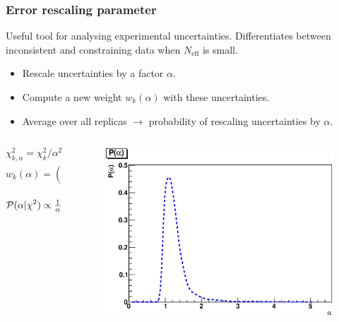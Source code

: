 \documentclass[10pt]{beamer}
\newcommand{\be}{\begin{equation*}}
\newcommand{\ee}{\end{equation*}}
\def\smallfrac#1#2{\hbox{${{#1}\over {#2}}$}}
\begin{document}
\begin{frame}
\frametitle{Error rescaling parameter}
Useful tool for analysing experimental uncertainties. 
Differentiates between inconsistent and constraining data when $N_{\mathrm{eff}}$ is small.
\begin{itemize}
		\item<1-> Rescale uncertainties by a factor $\alpha$.
		\item<1-> Compute a new weight $w_k(\alpha)$ with these uncertainties.
		\item<1-> Average over all replicas $\to$ probability of rescaling uncertainties by $\alpha$.
\end{itemize}


\begin{columns}
  \begin{column}{0.5\textwidth}
  \begin{block}{}
\be \chi^2_{k,\alpha} = \chi^2_k/\alpha^2, \ee
\be w_k(\alpha) = (\chi^2_{k,\alpha})^{(n-1)/2}\mathrm{e}^{-\chi^2_{k,\alpha}/2,}\ee
\be \mathcal{P}(\alpha | \chi^2)\propto \smallfrac{1}{\alpha}\sum_{k=1}^N w_k(\alpha).\ee
\end{block}
  \end{column}
  
    \begin{column}{0.5\textwidth}
 \begin{figure}[b!]
    \begin{center}
      \includegraphics[width=1\textwidth]{palpha-jets-t0.eps}
    \end{center}
\end{figure}

  \end{column}  
  \end{columns}

\begin{figure}[b!]
    \begin{center}
    \end{center}
    \vskip-0.5cm

\end{figure}

\end{frame}
\end{document}
